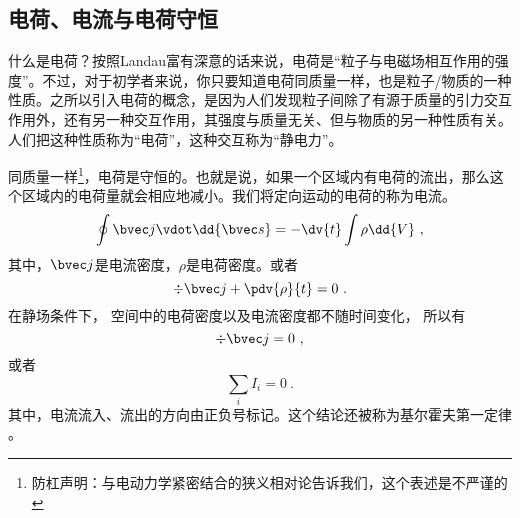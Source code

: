 
\begin{issues}
\issueDraft
\end{issues}

\subsection{电荷、电流与电荷守恒}
什么是电荷？按照Landau富有深意的话来说，电荷是“粒子与电磁场相互作用的强度”。不过，对于初学者来说，你只要知道电荷同质量一样，也是粒子/物质的一种性质。之所以引入电荷的概念，是因为人们发现粒子间除了有源于质量的引力交互作用外，还有另一种交互作用，其强度与质量无关、但与物质的另一种性质有关。人们把这种性质称为“电荷”，这种交互称为“静电力”。

同质量一样\footnote{防杠声明：与电动力学紧密结合的狭义相对论告诉我们，这个表述是不严谨的}，电荷是守恒的。也就是说，如果一个区域内有电荷的流出，那么这个区域内的电荷量就会相应地减小。我们将定向运动的电荷的称为电流。
$$
\oint \bvec j \vdot \dd{\bvec s}  =  - \dv{t} \int \rho \dd{V}~,
$$
其中，$\bvec j$是电流密度，$\rho$是电荷密度。或者
$$
\div \bvec j + \pdv{\rho}{t} = 0~.
$$
在静场条件下， 空间中的电荷密度以及电流密度都不随时间变化， 所以有
$$
\div \bvec j = 0~,
$$
或者
$$\sum_i I_i = 0~.$$
其中，电流流入、流出的方向由正负号标记。这个结论还被称为基尔霍夫第一定律 。

